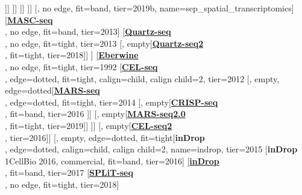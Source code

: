 \documentclass[12pt, a4]{article}
\begin{document}
\begin{center}
\begin{forest}
					[\href{https://science.sciencemag.org/content/363/6434/1463}{\textbf{Slide-seq\textsuperscript{\large{\textmu}}}}\\\citealt{rodriques2019}, no edge, fit=band, tier=2019]
				]]
			]]
		]]
	]]
	[, no edge, fit=band, tier=2019b, name=sep_spatial_transcriptomics]
	[\href{https://www.nature.com/articles/ncomms13182}{\textbf{MASC-seq}}\\\citealt{vickovic2016}, no edge, fit=band, tier=2013]
	[\href{https://genomebiology.biomedcentral.com/articles/10.1186/gb-2013-14-4-r31}{\textbf{Quartz-seq}}\\\citealt{sasagawa2013}, no edge, fit=tight, tier=2013
		[, empty[\href{https://genomebiology.biomedcentral.com/articles/10.1186/s13059-018-1407-3}{\textbf{Quartz-seq2}}\\\citealt{sasagawa2018}, fit=tight, tier=2018]]
	]
	[\href{https://www.pnas.org/content/89/7/3010}{\textbf{Eberwine}}\\\citealt{eberwine1992}, no edge, fit=tight, tier=1992
	[\href{https://www.cell.com/cell-reports/fulltext/S2211-1247(12)00228-8}{\textbf{CEL-seq}}\\\citealt{hashimshony2012}, edge=dotted, fit=tight, calign=child, calign child=2, tier=2012
		[, empty, edge=dotted[\href{https://science.sciencemag.org/content/343/6172/776}{\textbf{MARS-seq}}\\\citealt{jaitin2014}, edge=dotted, fit=tight, tier=2014
			[, empty[\href{https://linkinghub.elsevier.com/retrieve/pii/S0092-8674(16)31611-7}{\textbf{CRISP-seq}}\\\citealt{jaitin2016}, fit=band, tier=2016
			]]
			[, empty[\href{https://www.nature.com/articles/s41596-019-0164-4}{\textbf{MARS-seq2.0}}\\\citealt{keren-shaul2019}, fit=tight, tier=2019]]
		]]
		[, empty[\href{https://genomebiology.biomedcentral.com/articles/10.1186/s13059-016-0938-8}{\textbf{CEL-seq2}}\\\citealt{hashimshony2016}, tier=2016]]
		[, empty, edge=dotted, fit=tight[\textbf{inDrop}\\\citealt{klein2015}, edge=dotted, calign=child, calign child=2, name=indrop, tier=2015
			[\textbf{inDrop}\\1CellBio 2016, commercial, fit=band,  tier=2016]
			[\href{https://www.nature.com/articles/nprot.2016.154}{\textbf{inDrop}}\\\citealt{zilionis2017}, fit=band, tier=2017
				[\href{https://science.sciencemag.org/content/360/6385/176}{\textbf{SPLiT-seq}}\\\citealt{rosenberg2018}, no edge, fit=tight, tier=2018]

\end{forest}
\end{center}
\end{document}
